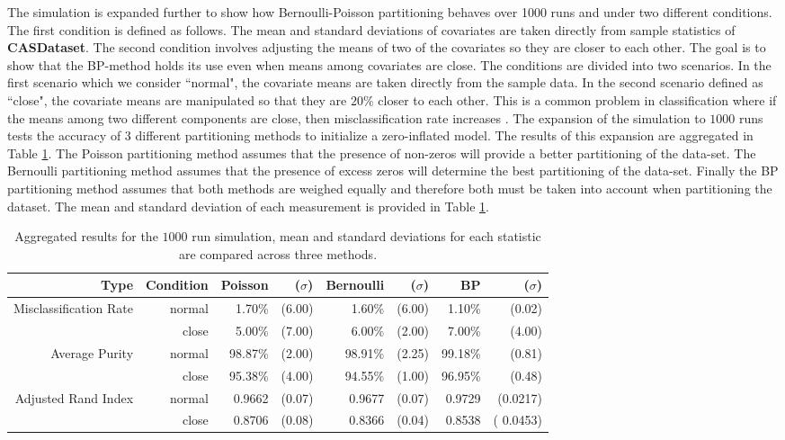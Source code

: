 \documentclass[11pt,letterpaper]{article}
\numberwithin{equation}{section}
\numberwithin{equation}{section}
\numberwithin{equation}{section}
\begin{document}
The simulation is expanded further to show how Bernoulli-Poisson partitioning behaves over 1000 runs and under two different conditions. The first condition is defined as follows. The mean and standard deviations of covariates are taken directly from sample statistics of \textbf{CASDataset}. The second condition involves adjusting the means of two of the covariates so they are closer to each other. The goal is to show that the BP-method holds its use even when means among covariates are close. The conditions are divided into two scenarios. In the first scenario which we consider ``normal", the covariate means are taken directly from the sample data. In the second scenario defined as ``close", the covariate means are manipulated so that they are $20 \%$ closer to each other. This is a common problem in classification where if the means among two different components are close, then misclassification rate increases \citep{LimHwa}. The expansion of the simulation to $1000$ runs tests the accuracy of 3 different partitioning methods to initialize a zero-inflated model. The results of this expansion are aggregated in Table \ref{table:exper2}.  The Poisson partitioning method assumes that the presence of non-zeros will provide a better partitioning of the data-set. The Bernoulli partitioning method assumes that the presence of excess zeros will determine the best partitioning of the data-set. Finally the BP partitioning method assumes that both methods are weighed equally and therefore both must be taken into account when partitioning the dataset. The mean and standard deviation of each measurement is provided in Table \ref{table:exper2}.

\begin{table}[!htb]
\begin{center}
\caption{Aggregated results for the $1000$ run simulation, mean and standard deviations for each statistic are compared across three methods.}
\label{table:exper2}
\begin{tabular}{rrrrrrrr}
\hline\hline
Type   & Condition & Poisson & ($\sigma $) & Bernoulli & ($ \sigma $) & BP & ($ \sigma $) \\
\hline
Misclassification Rate& normal        & 1.70\% & (6.00)       & 1.60\%  & (6.00)         & 1.10\% & (0.02)         \\
       & close      & 5.00\% & (7.00)       & 6.00\% & (2.00)         & 7.00\% & (4.00)         \\
Average Purity & normal     & 98.87\% & (2.00)    & 98.91\% & (2.25)      & 99.18\% & (0.81)     \\
       & close       & 95.38\% & (4.00)    & 94.55\% & (1.00)      & 96.95\% & (0.48)      \\
Adjusted Rand Index  & normal      & 0.9662 & (0.07)    & 0.9677  & (0.07)     & 0.9729 & (0.0217)      \\
       & close         & 0.8706 & (0.08)    & 0.8366 & (0.04)      & 0.8538 & ( 0.0453) \\
       \hline\hline
\end{tabular}
\end{center}
\end{table}
\end{document}
